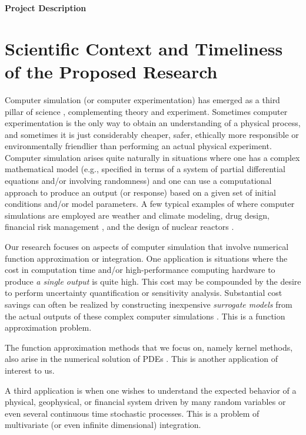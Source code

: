 \documentclass[11pt]{NSFamsart}
\begin{document}

\centerline{\Large \bf Project Description}
\section{Scientific Context and Timeliness of the Proposed Research}
Computer simulation (or computer experimentation) has emerged as a third pillar of science \citep{PITAC05,OdenGhattas14}, complementing theory and experiment. Sometimes computer experimentation is the only way to obtain an understanding of a physical process, and sometimes it is just considerably cheaper, safer, ethically more responsible or environmentally friendlier than performing an actual physical experiment.  Computer simulation arises quite naturally in situations where one has a complex mathematical model (e.g., specified in terms of a system of partial differential equations and/or involving randomness) and one can use a computational approach to produce an output (or response) based on a given set of initial conditions and/or model parameters. A few typical examples of where computer simulations are employed are weather and climate modeling, drug design, financial risk management \citep{Gla03}, and the design of nuclear reactors \citep[Sect.\ 2.4]{Smi14a}.

Our research focuses on aspects of computer simulation that involve numerical function approximation or integration.  One application is situations where the cost in computation time and/or high-performance computing hardware to produce \emph{a single output} is quite high.  This cost may be compounded by the desire to perform uncertainty quantification or sensitivity analysis. Substantial cost savings can often be realized by constructing inexpensive \emph{surrogate models} from the actual outputs of these complex computer simulations \citep{FangEtAl06,ForEtal09,SantnerWilliamsNotz03}.  This is a function approximation problem.

The function approximation methods that we focus on, namely kernel methods, also arise in the numerical solution of PDEs \citep{ChenEtAl14,FornbergFlyer15,SarraKansa09}.  This is another application of interest to us.

A third application is when one wishes to understand the expected behavior of a physical, geophysical, or financial system driven by many random variables or even several continuous time stochastic processes.  This is a problem of multivariate (or even infinite dimensional) integration.
\end{document}
